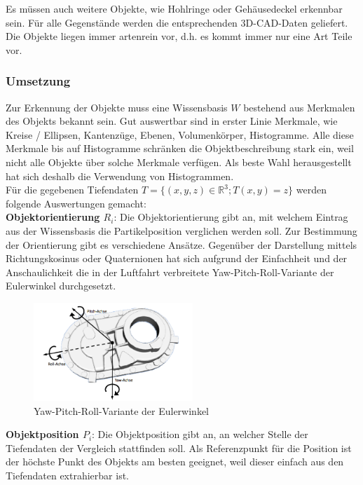 Es müssen auch weitere Objekte, wie Hohlringe oder Gehäusedeckel erkennbar sein. Für alle Gegenstände werden die entsprechenden 3D-CAD-Daten geliefert. Die Objekte liegen immer artenrein vor, d.h. es kommt immer nur eine Art Teile vor. \\

\subsubsection{Umsetzung}
Zur Erkennung der Objekte muss eine Wissensbasis $W$ bestehend aus Merkmalen des Objekts bekannt sein. Gut auswertbar sind in erster Linie Merkmale, wie Kreise / Ellipsen, Kantenzüge, Ebenen, Volumenkörper, Histogramme. Alle diese Merkmale bis auf Histogramme schränken die Objektbeschreibung stark ein, weil nicht alle Objekte über solche Merkmale verfügen. Als beste Wahl herausgestellt hat sich deshalb die Verwendung von Histogrammen. \\

Für die gegebenen Tiefendaten $T = \{ (x,y,z) \in \mathbb{R}^3 ; T(x,y)=z\}$ werden folgende Auswertungen gemacht: \\

\textbf{Objektorientierung $R_i$}: Die Objektorientierung gibt an, mit welchem Eintrag aus der Wissensbasis die Partikelposition verglichen werden soll. Zur Bestimmung der Orientierung gibt es verschiedene Ansätze. Gegenüber der Darstellung mittels Richtungskosinus oder Quaternionen hat sich aufgrund der Einfachheit und der Anschaulichkeit die in der Luftfahrt verbreitete Yaw-Pitch-Roll-Variante der Eulerwinkel durchgesetzt.

\begin{figure}[htbp]
	\centering
	\includegraphics[width=6cm]{images/yaw-pitch-roll}
	\caption{Yaw-Pitch-Roll-Variante der Eulerwinkel}
	\label{Fig-Yaw-Pitch-Roll}
\end{figure}

\textbf{Objektposition $P_i$}: Die Objektposition gibt an, an welcher Stelle der Tiefendaten der Vergleich stattfinden soll. Als Referenzpunkt für die Position ist der höchste Punkt des Objekts am besten geeignet, weil dieser einfach aus den Tiefendaten extrahierbar ist. \\

